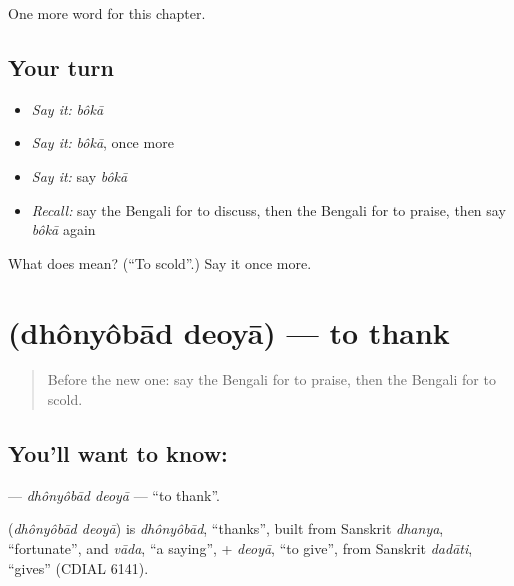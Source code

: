 \begin{grammarlens}[title={What you've built}]
One more word for this chapter.
\end{grammarlens}

\subsection*{Your turn}
\begin{itemize}
\raggedright
  \item \emph{Say it:} \emph{bôkā}
  \item \emph{Say it:} \emph{bôkā}, once more
  \item \emph{Say it:} say \emph{bôkā}
  \item \emph{Recall:} say the Bengali for to discuss, then the Bengali for to praise, then say \emph{bôkā} again
\end{itemize}

\begin{tcolorbox}[breakable,colback=teal!4,colframe=teal!35!black,title={Before you move on}]
What does  mean? (\textquotedblleft{}To scold\textquotedblright{}.) Say it once more.
\end{tcolorbox}
\section[\texorpdfstring{\bn{ধন্যবাদ} \bn{দেওয়া} (dhônyôbād deoyā)}{ধন্যবাদ দেওয়া (dhônyôbād deoyā)}]{  (dhônyôbād deoyā) — to thank}

\label{lesson:BN-C153-dhonyobad-deoya}



\begin{quote}
Before the new one: say the Bengali for to praise, then the Bengali for to scold.
\end{quote}

\subsection*{You'll want to know:  }
\textbf{ } — \emph{dhônyôbād deoyā} — \textquotedblleft{}to thank\textquotedblright{}.

\begin{cousinweb}
\textbf{ } (\emph{dhônyôbād deoyā}) is \emph{dhônyôbād}, \textquotedblleft{}thanks\textquotedblright{}, built from Sanskrit \emph{dhanya}, \textquotedblleft{}fortunate\textquotedblright{}, and \emph{vāda}, \textquotedblleft{}a saying\textquotedblright{}, + \emph{deoyā}, \textquotedblleft{}to give\textquotedblright{}, from Sanskrit \emph{dadāti}, \textquotedblleft{}gives\textquotedblright{} (CDIAL 6141).
\end{cousinweb}


